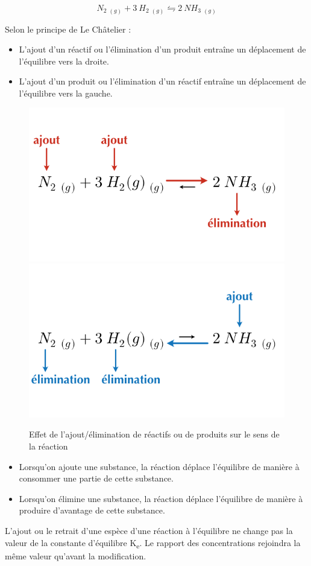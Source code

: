 \documentclass[
  11pt,
  french,
  a4paper,
  openany]{book}
\providecommand{\tightlist}{%
  \setlength{\itemsep}{0pt}\setlength{\parskip}{0pt}}
\begin{document}
\[
N_2\ _{(g)} + 3\ H_2\ _{(g)} \leftrightharpoons 2\ NH_3\ _{(g)}
\]

Selon le principe de Le Châtelier :

\begin{itemize}
\tightlist
\item
  L'ajout d'un réactif ou l'élimination d'un produit entraîne un déplacement de l'équilibre vers la droite.
\item
  L'ajout d'un produit ou l'élimination d'un réactif entraîne un déplacement de l'équilibre vers la gauche.
\end{itemize}

\begin{figure}

{\centering \includegraphics[width=0.45\linewidth]{images/equilibres-concentrations-2a} \includegraphics[width=0.45\linewidth]{images/equilibres-concentrations-2b} 

}

\caption{Effet de l'ajout/élimination de réactifs ou de produits sur le sens de la réaction}\label{fig:equilibres-concentrations-2}
\end{figure}

\begin{itemize}
\tightlist
\item
  Lorsqu'on ajoute une substance, la réaction déplace l'équilibre de manière à consommer une partie de cette substance.
\item
  Lorsqu'on élimine une substance, la réaction déplace l'équilibre de manière à produire d'avantage de cette substance.
\end{itemize}

L'ajout ou le retrait d'une espèce d'une réaction à l'équilibre ne change pas la valeur de la constante d'équilibre K\textsubscript{e}. Le rapport des concentrations rejoindra la même valeur qu'avant la modification.
\end{document}
